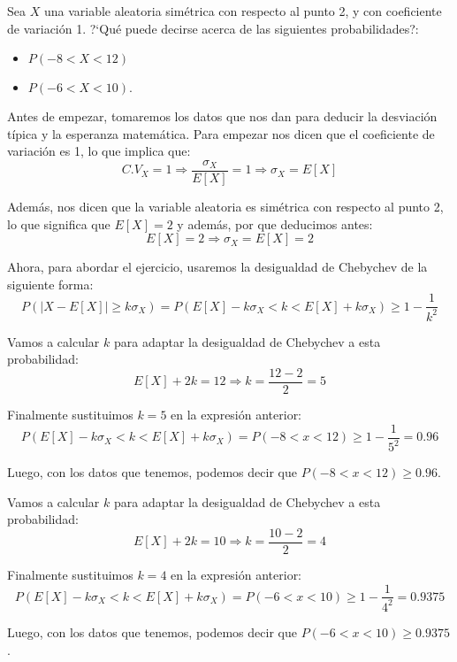 \problem

Sea $X$ una variable aleatoria sim{\'e}trica con respecto al
punto 2, y con coeficiente de variaci{\'o}n 1. ?`Qu{\'e} puede decirse acerca de las
siguientes probabilidades?:
\begin{itemize}
\item $P(-8<X<12)$
\item $P(-6<X<10).$
\end{itemize}

Antes de empezar, tomaremos los datos que nos dan para deducir la desviación típica y la esperanza matemática. Para empezar nos dicen que el coeficiente de variación es 1, lo que implica que:
\begin{equation*}
    C.V_X = 1 \Rightarrow \dfrac{\sigma_X}{E[X]} = 1 \Rightarrow \sigma_X = E[X]
\end{equation*}

Además, nos dicen que la variable aleatoria es simétrica con respecto al punto 2, lo que significa que $E[X] = 2$ y además, por que deducimos antes:
\begin{equation*}
    E[X] = 2 \Rightarrow \sigma_X = E[X] = 2
\end{equation*}

Ahora, para abordar el ejercicio, usaremos la desigualdad de Chebychev de la siguiente forma:
\begin{equation*}
    P(|X-E[X]| \geq k \sigma_X) = P(E[X] - k\sigma_X < k < E[X] + k\sigma_X) \geq 1 - \dfrac{1}{k^2}
\end{equation*}

\subproblem

Vamos a calcular $k$ para adaptar la desigualdad de Chebychev a esta probabilidad:
\begin{equation*}
    E[X] + 2k = 12 \Rightarrow k = \dfrac{12-2}{2} = 5
\end{equation*}

Finalmente sustituimos $k=5$ en la expresión anterior:
\begin{equation*}
    P(E[X] - k\sigma_X < k < E[X] + k\sigma_X) = P(-8 < x < 12) \geq 1 - \dfrac{1}{5^2} = 0.96
\end{equation*}

Luego, con los datos que tenemos, podemos decir que $P(-8 < x < 12) \geq 0.96$.

\subproblem

Vamos a calcular $k$ para adaptar la desigualdad de Chebychev a esta probabilidad:
\begin{equation*}
    E[X] + 2k = 10 \Rightarrow k = \dfrac{10-2}{2} = 4
\end{equation*}

Finalmente sustituimos $k=4$ en la expresión anterior:
\begin{equation*}
    P(E[X] - k\sigma_X < k < E[X] + k\sigma_X) = P(-6 < x < 10) \geq 1 - \dfrac{1}{4^2} = 0.9375
\end{equation*}

Luego, con los datos que tenemos, podemos decir que $P(-6 < x < 10) \geq 0.9375$.
